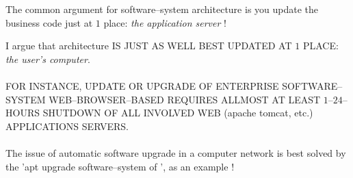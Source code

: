 \textcolor{purplish}{
The common argument for \webbrowserbased software--system 
architecture is you update the business code just at $1$
place: \emph{the application server} !}

\textcolor{purplish}{
I argue that \thickclient architecture IS JUST AS WELL 
BEST UPDATED AT $1$ PLACE: \emph{the user's computer}.
\\
\\
FOR INSTANCE, UPDATE OR UPGRADE OF ENTERPRISE SOFTWARE--SYSTEM
WEB--BROWSER--BASED REQUIRES ALLMOST AT LEAST $1$--$24$--HOURS
SHUTDOWN OF ALL INVOLVED WEB (apache tomcat, etc.) APPLICATIONS SERVERS.}
\\
\\
\textcolor{purplish}{
The issue of automatic software upgrade in a computer
network is best solved by the 'apt upgrade software--system
of \debianlinux', as an example !
}